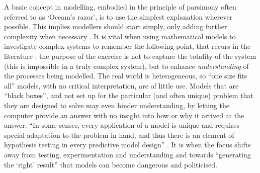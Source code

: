 A basic concept in modelling, embodied in the principle of parsimony
often referred to as `Occam's razor',
is to use the simplest explanation wherever possible. This implies
modellers should start simply, only adding further complexity when
necessary \citep{batty1976urban}.  It is vital when
using mathematical models to investigate complex systems to remember the
following point, that recurs in the literature \citep{Wilson1970, Smil1993,
MacKay2009}: the purpose of the exercise is not to capture the totality
of the system (this is impossible in a truly complex system), but to enhance
\emph{understanding} of the processes being modelled.
The real world is heterogeneous, so ``one size fits all'' models, with no
critical interpretation, are of little use. Models that are ``black
boxes'', and not set up for the particular (and often unique) problem that they
are designed to solve may even hinder understanding,
by letting the computer provide an answer with no insight into how or why it
arrived at the answer. ``In some senses, every
application of a model is unique and requires special adaptation to the
problem in hand, and thus there is an element of hypothesis testing in
every predictive model design'' \citep[p.~4]{batty1976urban}. It is when the
focus shifts away from testing, experimentation and understanding and towards
``generating the `right' result'' that models can become dangerous and
politicised.

